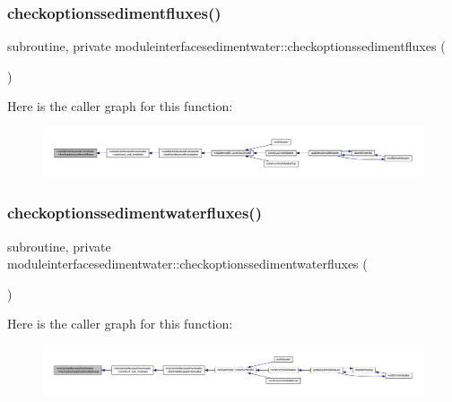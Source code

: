 \subsubsection{\texorpdfstring{checkoptionssedimentfluxes()}{checkoptionssedimentfluxes()}}
{\footnotesize\ttfamily subroutine, private moduleinterfacesedimentwater\+::checkoptionssedimentfluxes (\begin{DoxyParamCaption}{ }\end{DoxyParamCaption})\hspace{0.3cm}{\ttfamily [private]}}

Here is the caller graph for this function\+:\nopagebreak
\begin{figure}[H]
\begin{center}
\leavevmode
\includegraphics[width=350pt]{namespacemoduleinterfacesedimentwater_af1236045d4bf3e91947d80c8c3140745_icgraph}
\end{center}
\end{figure}
\mbox{\label{namespacemoduleinterfacesedimentwater_a4e30b1a0b5e1d1437a7a7f27bc7aea53}} 
\subsubsection{\texorpdfstring{checkoptionssedimentwaterfluxes()}{checkoptionssedimentwaterfluxes()}}
{\footnotesize\ttfamily subroutine, private moduleinterfacesedimentwater\+::checkoptionssedimentwaterfluxes (\begin{DoxyParamCaption}{ }\end{DoxyParamCaption})\hspace{0.3cm}{\ttfamily [private]}}

Here is the caller graph for this function\+:\nopagebreak
\begin{figure}[H]
\begin{center}
\leavevmode
\includegraphics[width=350pt]{namespacemoduleinterfacesedimentwater_a4e30b1a0b5e1d1437a7a7f27bc7aea53_icgraph}
\end{center}
\end{figure}
\mbox{\label{namespacemoduleinterfacesedimentwater_a3d7dba6457e9607bdd56867fc1e7516c}} 
